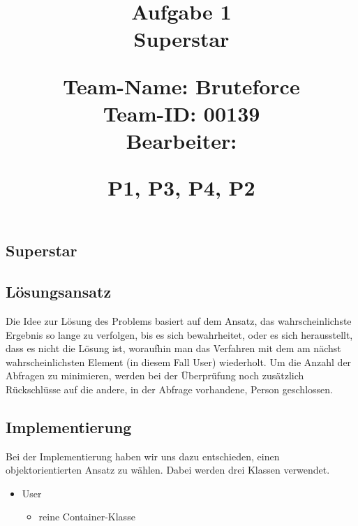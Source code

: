 \documentclass{article}
\begin{document}
\title{
{\Huge Aufgabe 1\\Superstar}\\
\vspace{.5cm}
\begin{large}
Team-Name: Bruteforce\\
Team-ID: 00139\\
Bearbeiter:\\ 
\end{large}
\begin{normalsize}
P1,
P3,
P4,
P2
\end{normalsize}
}
\author{}
\date{}
\maketitle
\vspace{5cm}
\tableofcontents
\newpage
\begin{flushleft}
\section{Superstar}
\subsection{Lösungsansatz}
Die Idee zur Lösung des Problems basiert auf dem Ansatz, das wahrscheinlichste Ergebnis so lange zu verfolgen, bis es sich bewahrheitet, oder es sich herausstellt, dass es nicht die Lösung ist, woraufhin man das Verfahren mit dem am nächst wahrscheinlichsten Element (in diesem Fall User) wiederholt. Um die Anzahl der Abfragen zu minimieren, werden bei der Überprüfung noch zusätzlich  Rückschlüsse auf die andere, in der Abfrage vorhandene, Person geschlossen.

\subsection{Implementierung}
Bei der Implementierung haben wir uns dazu entschieden, einen objektorientierten Ansatz zu wählen. Dabei werden drei Klassen verwendet.
\begin{itemize}

	\item User
	\begin{itemize}
		\item reine Container-Klasse
	\end{itemize}
	

\end{itemize}
\end{flushleft}
\end{document}
